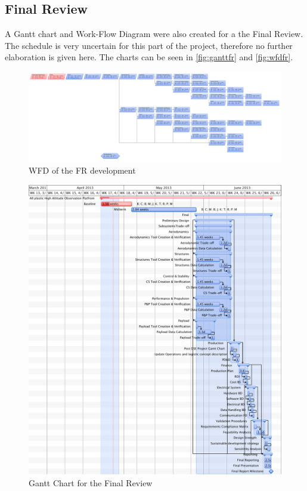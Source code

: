 \documentclass[a4paper]{report}
\begin{document}
\subsection{Final Review}
A Gantt chart and Work-Flow Diagram were also created for a the Final Review. The schedule is very uncertain for this part of the project, therefore no further elaboration is given here. The charts can be seen in \autoref{fig:ganttfr} and \autoref{fig:wfdfr}.
\begin{figure}[h]
	\centering
	
	\includegraphics[width=\textwidth]{Figures/FINALWFD.pdf}
	\caption{WFD of the FR development}
	\label{fig:wfdfr}
	
\end{figure}
\begin{figure}[h]
	\centering
	
	\includegraphics[width=\textwidth]{Figures/FINALGANTT.pdf}
	\caption{Gantt Chart for the Final Review}
	\label{fig:ganttfr}
	
\end{figure}
\end{document}
